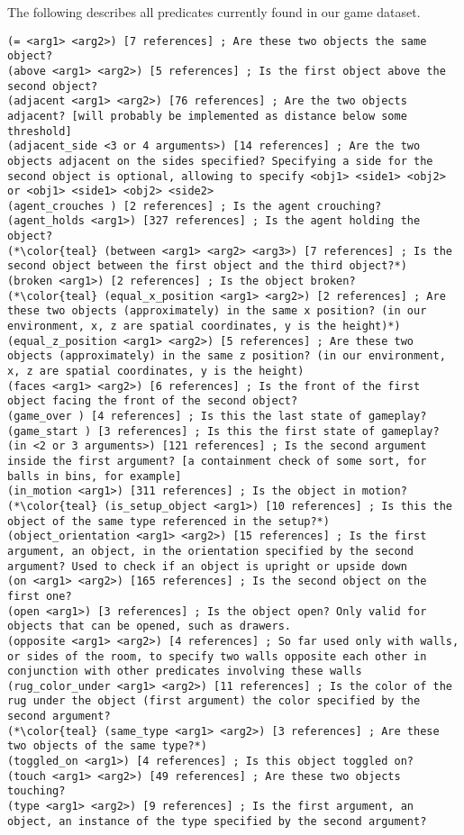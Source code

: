 \documentclass{article}
\begin{document}
            The following describes all predicates currently found in our game dataset.

\begin{lstlisting}
(= <arg1> <arg2>) [7 references] ; Are these two objects the same object?
(above <arg1> <arg2>) [5 references] ; Is the first object above the second object?
(adjacent <arg1> <arg2>) [76 references] ; Are the two objects adjacent? [will probably be implemented as distance below some threshold]
(adjacent_side <3 or 4 arguments>) [14 references] ; Are the two objects adjacent on the sides specified? Specifying a side for the second object is optional, allowing to specify <obj1> <side1> <obj2> or <obj1> <side1> <obj2> <side2>
(agent_crouches ) [2 references] ; Is the agent crouching?
(agent_holds <arg1>) [327 references] ; Is the agent holding the object?
(*\color{teal} (between <arg1> <arg2> <arg3>) [7 references] ; Is the second object between the first object and the third object?*)
(broken <arg1>) [2 references] ; Is the object broken?
(*\color{teal} (equal_x_position <arg1> <arg2>) [2 references] ; Are these two objects (approximately) in the same x position? (in our environment, x, z are spatial coordinates, y is the height)*)
(equal_z_position <arg1> <arg2>) [5 references] ; Are these two objects (approximately) in the same z position? (in our environment, x, z are spatial coordinates, y is the height)
(faces <arg1> <arg2>) [6 references] ; Is the front of the first object facing the front of the second object?
(game_over ) [4 references] ; Is this the last state of gameplay?
(game_start ) [3 references] ; Is this the first state of gameplay?
(in <2 or 3 arguments>) [121 references] ; Is the second argument inside the first argument? [a containment check of some sort, for balls in bins, for example]
(in_motion <arg1>) [311 references] ; Is the object in motion?
(*\color{teal} (is_setup_object <arg1>) [10 references] ; Is this the object of the same type referenced in the setup?*)
(object_orientation <arg1> <arg2>) [15 references] ; Is the first argument, an object, in the orientation specified by the second argument? Used to check if an object is upright or upside down
(on <arg1> <arg2>) [165 references] ; Is the second object on the first one?
(open <arg1>) [3 references] ; Is the object open? Only valid for objects that can be opened, such as drawers.
(opposite <arg1> <arg2>) [4 references] ; So far used only with walls, or sides of the room, to specify two walls opposite each other in conjunction with other predicates involving these walls
(rug_color_under <arg1> <arg2>) [11 references] ; Is the color of the rug under the object (first argument) the color specified by the second argument?
(*\color{teal} (same_type <arg1> <arg2>) [3 references] ; Are these two objects of the same type?*)
(toggled_on <arg1>) [4 references] ; Is this object toggled on?
(touch <arg1> <arg2>) [49 references] ; Are these two objects touching?
(type <arg1> <arg2>) [9 references] ; Is the first argument, an object, an instance of the type specified by the second argument?
\end{lstlisting}
\end{document}
